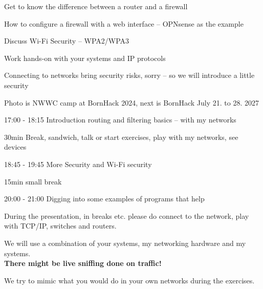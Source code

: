\documentclass[Screen16to9,17pt]{foils}
\begin{document}
\hlkprofiluk



\begin{list2}
\item Get to know the difference between a router and a firewall
\item How to configure a firewall with a web interface -- OPNsense as the example
\item Discuss Wi-Fi Security -- WPA2/WPA3
\item Work hands-on with your systems and IP protocols
\item Connecting to networks bring security risks, sorry -- so we will introduce a little security
\end{list2}

Photo is NWWC camp at BornHack 2024, next is BornHack July 21. to 28. 2027 



\begin{list2}
\item 17:00 - 18:15 Introduction routing and filtering basics -- with my networks
\item 30min Break, sandwich, talk or start exercises, play with my networks, see devices
\item 18:45 - 19:45 More Security and Wi-Fi security
\item 15min small break
\item 20:00 - 21:00 Digging into some examples of programs that help
\end{list2}

During the presentation, in breaks etc. please do connect to the network, play with TCP/IP, switches and routers.




We will use a combination of your systems, my networking hardware and my systems.\\
{\color{red} \bf There might be live sniffing done on traffic!}

We try to mimic what you would do in your own networks during the exercises.
\end{document}
